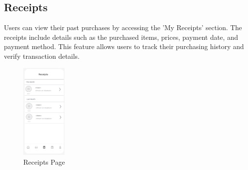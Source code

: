\documentclass[conference]{IEEEtran}
\begin{document}
\subsection{Receipts}
Users can view their past purchases by accessing the 'My Receipts' section. The receipts include details such as the purchased items, prices, payment date, and payment method. This feature allows users to track their purchasing history and verify transaction details.

\begin{figure}[H]  %
    \centering  %
    \includegraphics[width=0.2\textwidth]{receipts.PNG}  %
    \caption{Receipts Page}  %
\end{figure}
\end{document}
